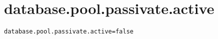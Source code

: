 \section{database.pool.passivate.active}
\label{configuration:DatabasePoolPassivateActive}
\AvailableInJavaOnly{\TODO}
\begin{lstlisting}[style=Props,caption={Usage example for \textit{database.pool.passivate.active}}]
database.pool.passivate.active=false
\end{lstlisting}